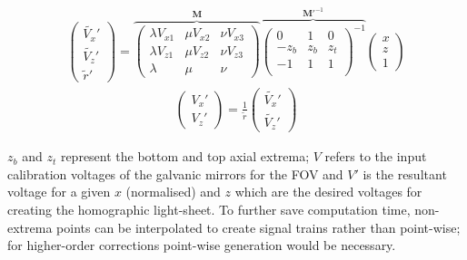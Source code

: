 \begin{align}
  \begin{pmatrix}
  \widetilde{V_x}'\\
  \widetilde{V_z}' \\
  \widetilde{r}'
  \end{pmatrix}
  =\overbrace{
  \begin{pmatrix}
  \lambda V_{x1} & \mu V_{x2} & \nu V_{x3} \\
  \lambda V_{z1} & \mu V_{z2} & \nu V_{z3} \\
  \lambda & \mu & \nu
\end{pmatrix}}^{\textbf{M}}
  \overbrace{
  \begin{pmatrix}
      0 & 1 & 0 \\
      -z_b & z_b & z_t \\
      -1 & 1 & 1 \\
    \end{pmatrix}^{-1}}^{\textbf{M}'^{-1}}
  \begin{pmatrix}
  x\\
  z \\
  1
  \end{pmatrix}\nonumber
\end{align}
  \begin{align}
  \begin{pmatrix}
    V_x'\\
    V_z'
  \end{pmatrix} = \frac{1}{\widetilde{r}}
  \begin{pmatrix}
  \widetilde{V_x}'\\
  \widetilde{V_z}'
  \end{pmatrix}
\end{align}

$z_b$ and $z_t$ represent the bottom and top axial extrema; $V$ refers to the input calibration voltages of the galvanic mirrors for the FOV and $V'$ is the resultant voltage for a given $x$ (normalised) and $z$ which are the desired voltages for creating the homographic light-sheet.
To further save computation time,
non-extrema points can be interpolated to create signal trains rather than point-wise; for higher-order corrections point-wise generation would be necessary.

